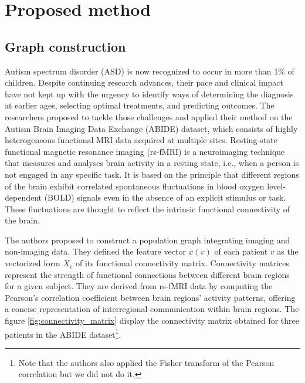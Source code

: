 
\section{Proposed method}

\subsection{Graph construction} 


Autism spectrum disorder (ASD) is now recognized to occur in more than 1\% of children. Despite continuing research advances, their pace and clinical impact have not kept up with the urgency to identify ways of determining the diagnosis at earlier ages, selecting optimal treatments, and predicting outcomes. The researchers \cite{Parisot17} proposed to tackle those challenges and applied their method on the Autism Brain Imaging Data Exchange (ABIDE) dataset, which consists of highly heterogeneous functional MRI data acquired at multiple sites. Resting-state functional magnetic resonance imaging (rs-fMRI) is a neuroimaging technique that measures and analyses brain activity in a resting state, i.e., when a person is not engaged in any specific task. 
It is based on the principle that different regions of the brain exhibit correlated spontaneous fluctuations in blood oxygen level-dependent (BOLD) signals even in the absence of an explicit stimulus or task. These fluctuations are thought to reflect the intrinsic functional connectivity of the brain. 

The authors \cite{Parisot17} proposed to construct a population graph integrating imaging and non-imaging data. 
They defined the feature vector $x(v)$ of each patient $v$ as the vectorized form $X_{v}$ of its functional connectivity matrix. Connectivity matrices represent the strength of functional connections between different brain regions for a given subject. They are derived from rs-fMRI data by computing the Pearson's correlation coefficient between brain regions' activity patterns, offering a concise representation of interregional communication within brain regions. The figure \ref{fig:connectivity_matrix} display the connectivity matrix obtained for three patients in the ABIDE dataset\footnote{Note that the authors also applied the Fisher transform of the Pearson correlation but we did not do it.}.

